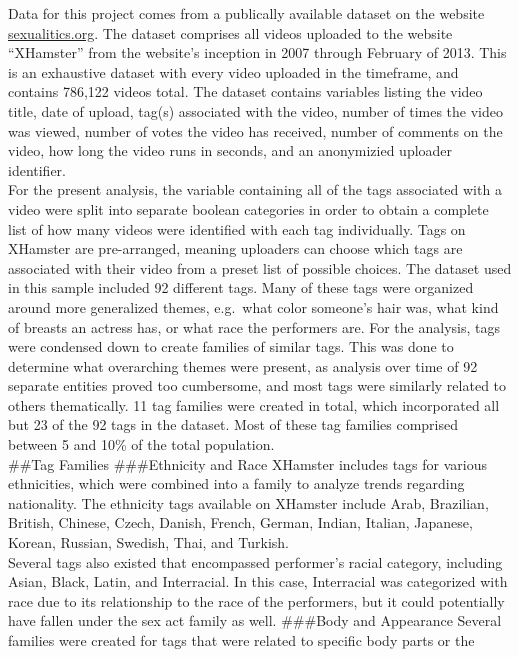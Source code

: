 \documentclass[11pt,]{article}
\begin{document}
Data for this project comes from a publically available dataset on the
website \href{www.sexualitics.org}{sexualitics.org}. The dataset
comprises all videos uploaded to the website ``XHamster'' from the
website's inception in 2007 through February of 2013. This is an
exhaustive dataset with every video uploaded in the timeframe, and
contains 786,122 videos total. The dataset contains variables listing
the video title, date of upload, tag(s) associated with the video,
number of times the video was viewed, number of votes the video has
received, number of comments on the video, how long the video runs in
seconds, and an anonymizied uploader identifier.\\
For the present analysis, the variable containing all of the tags
associated with a video were split into separate boolean categories in
order to obtain a complete list of how many videos were identified with
each tag individually. Tags on XHamster are pre-arranged, meaning
uploaders can choose which tags are associated with their video from a
preset list of possible choices. The dataset used in this sample
included 92 different tags. Many of these tags were organized around
more generalized themes, e.g.~what color someone's hair was, what kind
of breasts an actress has, or what race the performers are. For the
analysis, tags were condensed down to create families of similar tags.
This was done to determine what overarching themes were present, as
analysis over time of 92 separate entities proved too cumbersome, and
most tags were similarly related to others thematically. 11 tag families
were created in total, which incorporated all but 23 of the 92 tags in
the dataset. Most of these tag families comprised between 5 and 10\% of
the total population.\\
\#\#Tag Families \#\#\#Ethnicity and Race XHamster includes tags for
various ethnicities, which were combined into a family to analyze trends
regarding nationality. The ethnicity tags available on XHamster include
Arab, Brazilian, British, Chinese, Czech, Danish, French, German,
Indian, Italian, Japanese, Korean, Russian, Swedish, Thai, and
Turkish.\\
Several tags also existed that encompassed performer's racial category,
including Asian, Black, Latin, and Interracial. In this case,
Interracial was categorized with race due to its relationship to the
race of the performers, but it could potentially have fallen under the
sex act family as well. \#\#\#Body and Appearance Several families were
created for tags that were related to specific body parts or the
\end{document}
